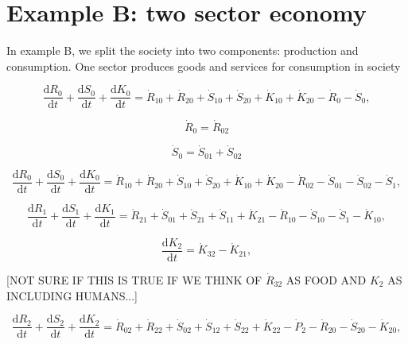 \section{Example B: two sector economy}
\label{sec:B_materials}

In example B, we split the society into two components: production and consumption. One sector produces goods and services for consumption in society

\begin{equation} \label{eq:CV_R_dot_0a}
	\frac{\mathrm{d}R_{0}}{\mathrm{d}t} 
	+ \frac{\mathrm{d}S_{0}}{\mathrm{d}t}	
	+ \frac{\mathrm{d}K_0}{\mathrm{d}t}
	=  \dot{R}_{10} + \dot{R}_{20} 
	+ \dot{S}_{10} + \dot{S}_{20} 
	+ \dot{K}_{10} + \dot{K}_{20} 
	- \dot{R}_{0} 
	- \dot{S}_{0},
\end{equation}

\begin{equation}
	\dot{R}_{0} = \dot{R}_{02}
\end{equation}

\begin{equation}
	\dot{S}_{0} = \dot{S}_{01} + \dot{S}_{02}
\end{equation}

\begin{equation} \label{eq:CV_R_dot_0b}
	\frac{\mathrm{d}R_{0}}{\mathrm{d}t} 
	+ \frac{\mathrm{d}S_{0}}{\mathrm{d}t}	 
	+ \frac{\mathrm{d}K_0}{\mathrm{d}t}
	=  \dot{R}_{10} + \dot{R}_{20} 
	+ \dot{S}_{10} + \dot{S}_{20} 
	+ \dot{K}_{10} + \dot{K}_{20} 
	- \dot{R}_{02} 
	- \dot{S}_{01} - \dot{S}_{02} - \dot{S}_{1},
\end{equation}

\begin{equation} \label{eq:CV_R_dot_1}
	\frac{\mathrm{d}R_{1}}{\mathrm{d}t} + \frac{\mathrm{d}S_{1}}{\mathrm{d}t}
	+ \frac{\mathrm{d}K_{1}}{\mathrm{d}t}
	=  \dot{R}_{21} 
	+ \dot{S}_{01} + \dot{S}_{21} + \dot{S}_{11}
	+ \dot{K}_{21} 
	- \dot{R}_{10} 
	- \dot{S}_{10} - \dot{S}_{1}
	- \dot{K}_{10},
\end{equation}

\begin{equation} \label{eq:CV_K_dot_2}
	\frac{\mathrm{d}K_{2}}{\mathrm{d}t}
	=  \dot{K}_{32} - \dot{K}_{21},
\end{equation}

[NOT SURE IF THIS IS TRUE IF WE THINK OF $\dot{R}_{32}$ AS FOOD AND $K_{2}$ AS INCLUDING HUMANS...]

\begin{equation} \label{eq:CV_R_dot_2}
	\frac{\mathrm{d}R_{2}}{\mathrm{d}t} + \frac{\mathrm{d}S_{2}}{\mathrm{d}t}
	+ \frac{\mathrm{d}K_{2}}{\mathrm{d}t}
	=  \dot{R}_{02} + \dot{R}_{22} 
	+ \dot{S}_{02} + \dot{S}_{12} + \dot{S}_{22} 
	+ \dot{K}_{22}
	- \dot{P}_{2}
	- \dot{R}_{20} 
	- \dot{S}_{20} 
	- \dot{K}_{20},
\end{equation}

